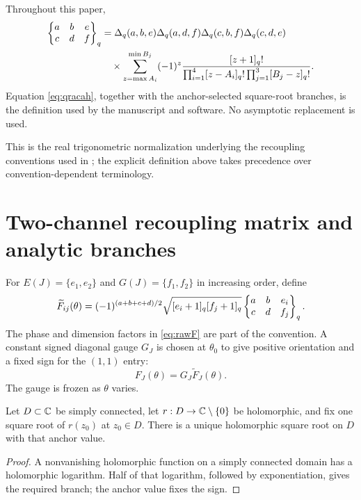 \begin{definition}
\label{def:q6jconvention}
Throughout this paper,
\begin{align}
\begin{Bmatrix}a&b&e\\c&d&f\end{Bmatrix}_{q}
&=
\Delta_q(a,b,e)\Delta_q(a,d,f)
\Delta_q(c,b,f)\Delta_q(c,d,e)
\nonumber\\
&\quad\times
\sum_{z=\max A_i}^{\min B_j}
(-1)^z
\frac{[z+1]_q!}
{\prod_{i=1}^{4}[z-A_i]_q!\prod_{j=1}^{3}[B_j-z]_q!}.
\label{eq:qracah}
\end{align}
Equation \eqref{eq:qracah}, together with the anchor-selected square-root branches, is the definition used by the manuscript and software.  No asymptotic replacement is used.
\end{definition}

This is the real trigonometric normalization underlying the recoupling conventions used in \cite{kirillovReshetikhin1989,kauffmanLins1994,taylorWoodward2005}; the explicit definition above takes precedence over convention-dependent terminology.

\section{Two-channel recoupling matrix and analytic branches}
For $E(J)=\{e_1,e_2\}$ and $G(J)=\{f_1,f_2\}$ in increasing order, define
\begin{equation}
\widetilde F_{ij}(\theta)=
(-1)^{(a+b+c+d)/2}
\sqrt{[e_i+1]_q[f_j+1]_q}
\begin{Bmatrix}a&b&e_i\\c&d&f_j\end{Bmatrix}_{q}.
\label{eq:rawF}
\end{equation}
The phase and dimension factors in \eqref{eq:rawF} are part of the convention.  A constant signed diagonal gauge $G_J$ is chosen at $\theta_0$ to give positive orientation and a fixed sign for the $(1,1)$ entry:
\begin{equation}
F_J(\theta)=G_J\widetilde F_J(\theta).
\label{eq:gaugedF}
\end{equation}
The gauge is frozen as $\theta$ varies.

\begin{lemma}
\label{lem:sqrtbranch}
Let $D\subset\mathbb C$ be simply connected, let $r:D\to\mathbb C\setminus\{0\}$ be holomorphic, and fix one square root of $r(z_0)$ at $z_0\in D$.  There is a unique holomorphic square root on $D$ with that anchor value.
\end{lemma}

\begin{proof}
A nonvanishing holomorphic function on a simply connected domain has a holomorphic logarithm.  Half of that logarithm, followed by exponentiation, gives the required branch; the anchor value fixes the sign.
\end{proof}

